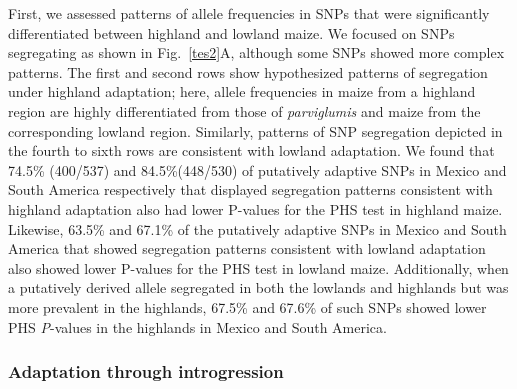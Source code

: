 {{First, we assessed patterns of allele frequencies in SNPs that were significantly differentiated between highland and lowland maize.
We focused on SNPs segregating as shown in Fig.~\ref{tes2}A, although some SNPs showed more complex patterns.
The first and second rows show hypothesized patterns of segregation under highland adaptation; here, allele frequencies in maize from a highland region are highly differentiated from those of \emph{parviglumis} and maize from the corresponding lowland region. %
Similarly, patterns of SNP segregation depicted in the fourth to sixth rows are consistent with lowland adaptation.
We found that 74.5\% (400/537) and 84.5\%(448/530) of putatively adaptive SNPs in Mexico and South America respectively that displayed segregation patterns consistent with highland adaptation also had lower P-values for the PHS test in highland maize.
Likewise, 63.5\% and 67.1\% of the putatively adaptive SNPs in Mexico and South America that showed segregation patterns consistent with lowland adaptation also showed lower P-values for the PHS test in lowland maize.
Additionally, when a putatively derived allele segregated in both the lowlands and highlands but was more prevalent in the highlands, 67.5\% and 67.6\% of such SNPs showed lower PHS \emph{P}-values in the highlands in Mexico and South America. 


\subsubsection{Adaptation through introgression}

}}
